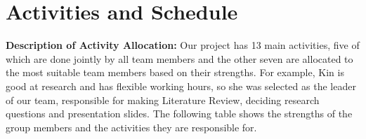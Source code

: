 \documentclass[mstat,12pt]{unswthesis}
\begin{document}
\hypertarget{activities-and-schedule}{%
\section{Activities and Schedule}\label{activities-and-schedule}}
\setlength{\parindent}{0pt} %


\textbf{Description of Activity Allocation:}
Our project has 13 main activities, five of which are done jointly by all team members and the other seven are allocated to the most suitable team members based on their strengths. For example, Kin is good at research and has flexible working hours, so she was selected as the leader of our team, responsible for making Literature Review, deciding research questions and presentation slides. The following table shows the strengths of the group members and the activities they are responsible for.
\end{document}
